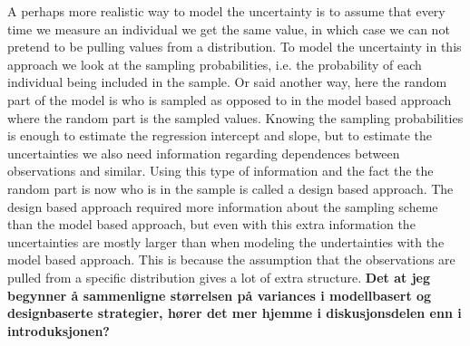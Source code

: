 \documentclass{article}
\begin{document}
A perhaps more realistic way to model the uncertainty is to assume that every time we measure an
individual we get the same value, in which case we can not pretend to be pulling
values from a distribution. To model the uncertainty in this approach we look at
the sampling probabilities, i.e. the probability of each individual being
included in the sample. Or said another way, here the random part of the model
is who is sampled as opposed to in the model based approach where the random
part is the sampled values. Knowing the sampling probabilities is enough to
estimate the regression intercept and slope, but to estimate the uncertainties
we also need information regarding dependences between observations and similar.
Using this type of information and the fact the the random part is now who is in
the sample is called a design based approach. The design based approach required
more information about the sampling scheme than the model based approach, but
even with this extra information the uncertainties are mostly larger than when
modeling the undertainties with the model based approach. This is because the
assumption that the observations are pulled from a specific distribution gives a
lot of extra structure.
\textbf{Det at jeg begynner å sammenligne størrelsen på variances i modellbasert
og designbaserte strategier, hører det mer hjemme i diskusjonsdelen enn i introduksjonen?}




\end{document}
